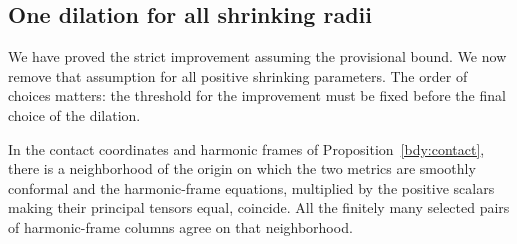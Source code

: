 \subsection{One dilation for all shrinking radii}

We have proved the strict improvement assuming the provisional bound.
We now remove that assumption for all positive shrinking parameters.
The order of choices matters: the threshold for the improvement must
be fixed before the final choice of the dilation.

\begin{proposition}
\label{mat:local}
In the contact coordinates and harmonic frames of
Proposition~\ref{bdy:contact}, there is a neighborhood of the origin
on which the two metrics are smoothly conformal and the
harmonic-frame equations, multiplied by the
positive scalars making their principal tensors equal, coincide.
All the finitely many selected pairs of harmonic-frame columns agree
on that neighborhood.
\end{proposition}

